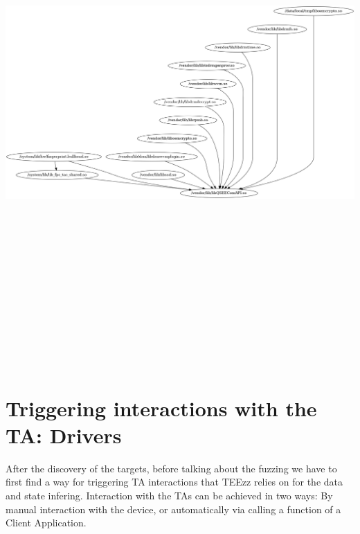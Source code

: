 \documentclass[a4paper,11pt,oneside]{report}
\newcommand{\sysname}{TEEzz\xspace}
\begin{document}
\includegraphics[width=16cm, height=20cm]{figures/nexus5x.png}
\chapter{Triggering interactions with the TA: Drivers}
After the discovery of the targets, before talking about the fuzzing we have to
first find a way for triggering TA interactions that \sysname relies on for the
data and state infering. Interaction with the TAs can be achieved in two ways:
By manual interaction with the device, or automatically via calling a function
of a Client Application.
\end{document}
